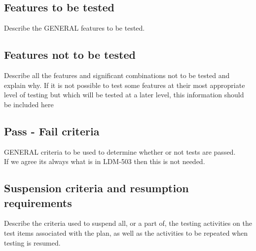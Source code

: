 \documentclass[DM,lsstdraft,STS,toc]{lsstdoc}
\begin{document}
\subsection{Features to be tested \label{sect:feat2tested}}
Describe the GENERAL features to be tested.
\subsection{Features not to be tested \label{sect:featnot2tested}}
Describe all the features and significant combinations not to be tested and explain why. If it is not possible to test some
features at their most appropriate level of testing but which will be tested at a later level, this information should be
included here
\subsection{Pass - Fail criteria \label{sect:passfail}}
GENERAL criteria to be used to determine whether or not tests are passed.\\
If we agree its always what is in LDM-503 then this is not needed. 

\subsection{Suspension criteria and resumption requirements \label{suspension}}
Describe the criteria used to suspend all, or a part of, the testing activities on the test items associated with
the plan, as well as the activities to be repeated when testing is resumed.

\end{document}
